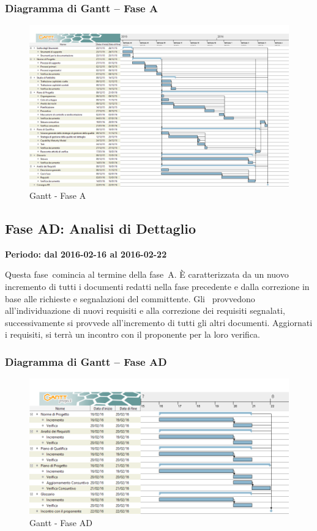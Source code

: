 \documentclass[../PianoProgetto.tex]{subfiles}
\begin{document}
		\subsubsection{Diagramma di Gantt – Fase A}
			\begin{figure}[!h]
				\centering
				\includegraphics[width=\textwidth]{gantt_png/1-analisi}
				\caption{Gantt - Fase A}
				\label{fig:Gantt - Fase A}
			\end{figure}			
	
	\subsection{Fase AD: Analisi di Dettaglio}
		\textbf{Periodo: dal 2016-02-16 al 2016-02-22}

				Questa fase\g\ comincia al termine della fase\g\ A. È caratterizzata da un nuovo incremento di tutti i documenti redatti nella fase precedente e dalla correzione in base alle richieste e segnalazioni del committente. Gli \analisti\ provvedono all'individuazione di nuovi requisiti e alla correzione dei requisiti segnalati, successivamente si provvede all'incremento di tutti gli altri documenti.  Aggiornati i requisiti, si terrà un incontro con il proponente per la loro verifica.
		\newpage			
		\subsubsection{Diagramma di Gantt – Fase AD}
			\begin{figure}[!h]
				\centering
				\includegraphics[width=\textwidth]{gantt_png/2-analisi_di_dettaglio}
				\caption{Gantt - Fase AD}
				\label{fig:Gantt - Fase AD}
			\end{figure}
\end{document}
